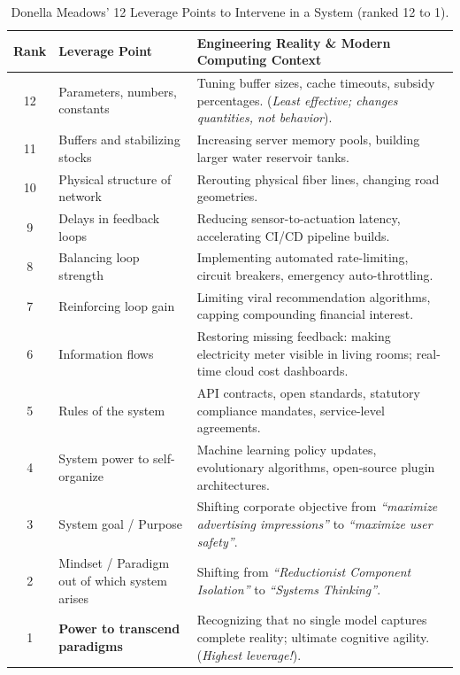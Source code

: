 \begin{table}[htbp]
\centering
\small
\renewcommand{\arraystretch}{1.2}
\begin{tabularx}{\textwidth}{clX}
\toprule
\textbf{Rank} & \textbf{Leverage Point} & \textbf{Engineering Reality \& Modern Computing Context} \\
\midrule
12 & Parameters, numbers, constants & Tuning buffer sizes, cache timeouts, subsidy percentages. (\textit{Least effective; changes quantities, not behavior}). \\
11 & Buffers and stabilizing stocks & Increasing server memory pools, building larger water reservoir tanks. \\
10 & Physical structure of network & Rerouting physical fiber lines, changing road geometries. \\
9  & Delays in feedback loops & Reducing sensor-to-actuation latency, accelerating CI/CD pipeline builds. \\
8  & Balancing loop strength & Implementing automated rate-limiting, circuit breakers, emergency auto-throttling. \\
7  & Reinforcing loop gain & Limiting viral recommendation algorithms, capping compounding financial interest. \\
6  & Information flows & Restoring missing feedback: making electricity meter visible in living rooms; real-time cloud cost dashboards. \\
5  & Rules of the system & API contracts, open standards, statutory compliance mandates, service-level agreements. \\
4  & System power to self-organize & Machine learning policy updates, evolutionary algorithms, open-source plugin architectures. \\
3  & System goal / Purpose & Shifting corporate objective from \textit{``maximize advertising impressions''} to \textit{``maximize user safety''}. \\
2  & Mindset / Paradigm out of which system arises & Shifting from \textit{``Reductionist Component Isolation''} to \textit{``Systems Thinking''}. \\
1  & \textbf{Power to transcend paradigms} & Recognizing that no single model captures complete reality; ultimate cognitive agility. (\textit{Highest leverage!}). \\
\bottomrule
\end{tabularx}
\caption{Donella Meadows' 12 Leverage Points to Intervene in a System (ranked 12 to 1).}
\label{tab:leverage_points}
\end{table}

